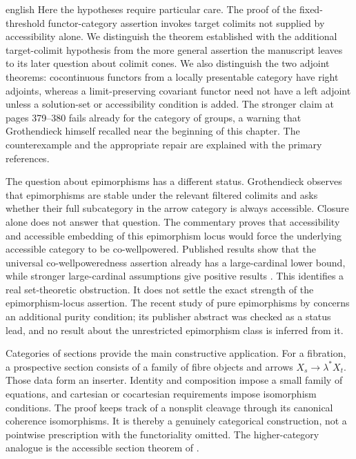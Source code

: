 \begin{otherlanguage*}{english}
Here the hypotheses require particular care. The proof of the fixed-threshold functor-category assertion invokes target colimits not supplied by accessibility alone. We distinguish the theorem established with the additional target-colimit hypothesis from the more general assertion the manuscript leaves to its later question about colimit cones. We also distinguish the two adjoint theorems: cocontinuous functors from a locally presentable category have right adjoints, whereas a limit-preserving covariant functor need not have a left adjoint unless a solution-set or accessibility condition is added. The stronger claim at pages 379--380 fails already for the category of groups, a warning that Grothendieck himself recalled near the beginning of this chapter. The counterexample and the appropriate repair are explained with the primary references.

The question about epimorphisms has a different status. Grothendieck observes that epimorphisms are stable under the relevant filtered colimits and asks whether their full subcategory in the arrow category is always accessible. Closure alone does not answer that question. The commentary proves that accessibility and accessible embedding of this epimorphism locus would force the underlying accessible category to be co-wellpowered. Published results show that the universal co-wellpoweredness assertion already has a large-cardinal lower bound, while stronger large-cardinal assumptions give positive results \citep{BagariaCasacubertaMathiasRosicky2015}. This identifies a real set-theoretic obstruction. It does not settle the exact strength of the epimorphism-locus assertion. The recent study of pure epimorphisms by \citet{Positselski2026Pure} concerns an additional purity condition; its publisher abstract was checked as a status lead, and no result about the unrestricted epimorphism class is inferred from it.

Categories of sections provide the main constructive application. For a fibration, a prospective section consists of a family of fibre objects and arrows $X_s\to\lambda^*X_t$. Those data form an inserter. Identity and composition impose a small family of equations, and cartesian or cocartesian requirements impose isomorphism conditions. The proof keeps track of a nonsplit cleavage through its canonical coherence isomorphisms. It is thereby a genuinely categorical construction, not a pointwise prescription with the functoriality omitted. The higher-category analogue is the accessible section theorem of \citet[Proposition 5.4.7.11]{Lurie2009HTT}.


\end{otherlanguage*}
